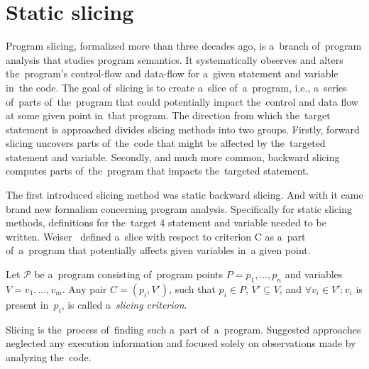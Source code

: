 \section{Static slicing}\label{chap:staticslicing}

Program slicing, formalized more than three decades ago,
is a~branch of~program analysis that studies program semantics.
It systematically observes and alters the~program's control-flow
and data-flow for a~given statement and variable in~the code.  
The goal of~slicing is to create a~slice of~a~program,
i.e., a~series of~parts of~the~program that could potentially
impact the~control and data flow at some given point in~that program. 
The direction from which the~target statement is approached divides 
slicing methods into two groups. 
Firstly, forward slicing uncovers parts of~the~code that 
might be affected by the~targeted statement and variable. 
Secondly, and much more common, backward slicing computes 
parts of~the~program that impacts the~targeted statement.

The first introduced slicing method was static backward slicing.
And with it came brand new formalism concerning program analysis. 
Specifically for static slicing methods, definitions for the~target 4
statement and variable needed to be written.
Weiser~\citep{Weiser84}
defined a~slice with respect to criterion C 
as a~part of~a~program that potentially affects given variables in~a given point. 

\begin{defn}\label{def02:5}
  Let $\mathcal{P}$ be a~program consisting of~program points 
  $P = p_1,\dots,p_n$ and variables $V = v_1,\dots,v_m$.
  Any pair $C = (p_i, V')$, such that $p_i \in P$, $V' \subseteq V$, and 
  $\forall v_i \in V': v_i$ is present in~$p_i$, 
  is called a~\emph{slicing criterion}.
\end{defn}

Slicing is the~process of~finding such a~part of~a~program. 
Suggested approaches neglected any execution information and 
focused solely on observations made by analyzing the~code.

